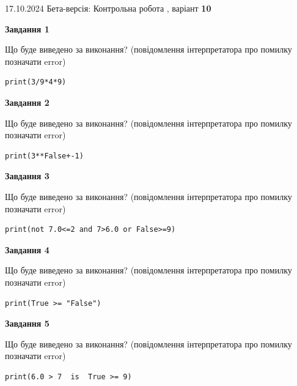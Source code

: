 \documentclass[12pt, ukrainian]{article}
\begin{document}
{\Large{17.10.2024 Бета-версія: Контрольна робота , варіант  \No \textbf { 10 }\par}}
{
\begin {large}
{\begin {center}\textbf{Завдання 1}\end {center}}

Що буде виведено за виконання? (повідомлення інтерпретатора про помилку позначати error)\par
\begin{verbatim}
print(3/9*4*9)
\end{verbatim}

{\begin {center}\textbf{Завдання 2}\end {center}}

Що буде виведено за виконання? (повідомлення інтерпретатора про помилку позначати error)\par
\begin{verbatim}
print(3**False+-1)
\end{verbatim}

{\begin {center}\textbf{Завдання 3}\end {center}}

Що буде виведено за виконання? (повідомлення інтерпретатора про помилку позначати error)\par
\begin{verbatim}
print(not 7.0<=2 and 7>6.0 or False>=9)
\end{verbatim}

{\begin {center}\textbf{Завдання 4}\end {center}}

Що буде виведено за виконання? (повідомлення інтерпретатора про помилку позначати error)\par
\begin{verbatim}
print(True >= "False")
\end{verbatim}

{\begin {center}\textbf{Завдання 5}\end {center}}

Що буде виведено за виконання? (повідомлення інтерпретатора про помилку позначати error)\par
\begin{verbatim}
print(6.0 > 7  is  True >= 9)
\end{verbatim}


\end{large}}
\end{document}
